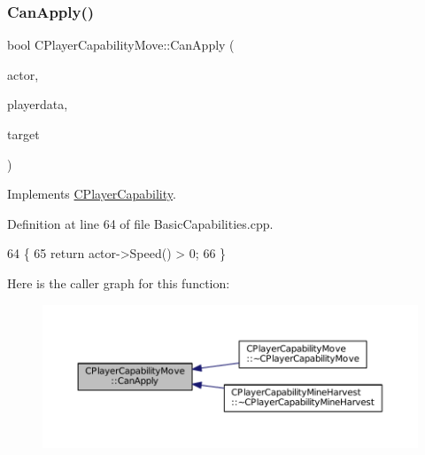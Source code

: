 \hypertarget{classCPlayerCapabilityMove_a76cbb0fa4051961c00e3169d11d76568}{}\label{classCPlayerCapabilityMove_a76cbb0fa4051961c00e3169d11d76568} 
\subsubsection{\texorpdfstring{Can\+Apply()}{CanApply()}}
{\footnotesize\ttfamily bool C\+Player\+Capability\+Move\+::\+Can\+Apply (\begin{DoxyParamCaption}\item[{std\+::shared\+\_\+ptr$<$ \hyperlink{classCPlayerAsset}{C\+Player\+Asset} $>$}]{actor,  }\item[{std\+::shared\+\_\+ptr$<$ \hyperlink{classCPlayerData}{C\+Player\+Data} $>$}]{playerdata,  }\item[{std\+::shared\+\_\+ptr$<$ \hyperlink{classCPlayerAsset}{C\+Player\+Asset} $>$}]{target }\end{DoxyParamCaption})\hspace{0.3cm}{\ttfamily [virtual]}}



Implements \hyperlink{classCPlayerCapability_ae96263e0950f496492f8baeb877b9554}{C\+Player\+Capability}.



Definition at line 64 of file Basic\+Capabilities.\+cpp.


\begin{DoxyCode}
64                                                                                                            
                                                 \{
65     \textcolor{keywordflow}{return} actor->Speed() > 0;
66 \}
\end{DoxyCode}
Here is the caller graph for this function\+:
\nopagebreak
\begin{figure}[H]
\begin{center}
\leavevmode
\includegraphics[width=350pt]{classCPlayerCapabilityMove_a76cbb0fa4051961c00e3169d11d76568_icgraph}
\end{center}
\end{figure}
\hypertarget{classCPlayerCapabilityMove_aef25bc0d224e993c46f5cd4cd6b8b7c8}{}\label{classCPlayerCapabilityMove_aef25bc0d224e993c46f5cd4cd6b8b7c8} 
